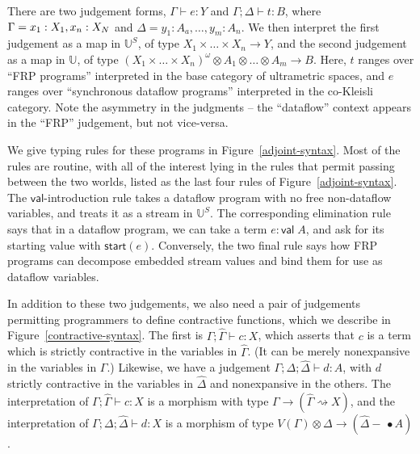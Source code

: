 \documentclass[nocopyrightspace,preprint]{sigplanconf}
\newcommand{\ultrametric}{\mathbb{U}}
\newcommand{\shrink}{\rightsquigarrow}
\newcommand{\Start}[1]{\mathsf{start}(#1)}
\newcommand{\lollishrink}{-\!\!\!\,\bullet}
\newcommand{\valtype}[1]{\mathsf{val}\;{#1}}
\newcommand{\judgeu}[3]{{#1} \vdash {#2} : {#3}}
\newcommand{\judgek}[4][\Gamma]{{#1};{#2} \vdash {#3} : {#4}}
\newcommand{\judgec}[4][\Gamma]{{#1};{#2} \vdash {#3} : {#4}}
\newcommand{\judgekc}[4][\Delta]{\Gamma;{#1};{#2} \vdash {#3} : {#4}}
\begin{document}
There are two judgement forms, $\judgeu{\Gamma}{e}{Y}$ and
$\judgek{\Delta}{t}{B}$, where $\Gamma = x_1:X_1,\label,x_n:X_N$ and
$\Delta = y_1:A_a, \ldots, y_m:A_n$.  We then interpret the first
judgement as a map in $\ultrametric^S$, of type $X_1 \times \ldots
\times X_n \to Y$, and the second judgement as a map in
$\ultrametric$, of type $(X_1 \times \ldots \times X_n)^\omega
\otimes A_1 \otimes \ldots \otimes A_m \to B$. Here, $t$ ranges over
``FRP programs'' interpreted in the base category of ultrametric
spaces, and $e$ ranges over ``synchronous dataflow programs''
interpreted in the co-Kleisli category. Note the asymmetry in 
the judgments -- the ``dataflow'' context appears in the ``FRP''
judgement, but not vice-versa. 

We give typing rules for these programs in
Figure~\ref{adjoint-syntax}.  Most of the rules are routine, with all
of the interest lying in the rules that permit passing between the two
worlds, listed as the last four rules of
Figure~\ref{adjoint-syntax}. The $\mathsf{val}$-introduction rule
takes a dataflow program with no free non-dataflow variables, and
treats it as a stream in $\ultrametric^S$. The corresponding elimination
rule says that in a dataflow program, we can take a term $e :
\valtype{A}$, and ask for its starting value with
$\Start{e}$. Conversely, the two final rule says how FRP programs
can decompose embedded stream values and bind them for use as 
dataflow variables.

In addition to these two judgements, we also need a pair of judgements
permitting programmers to define contractive functions, which we
describe in Figure~\ref{contractive-syntax}. The first is
$\judgec{\hat{\Gamma}}{c}{X}$, which asserts that $c$ is a term which
is strictly contractive in the variables in $\hat{\Gamma}$.  (It can
be merely nonexpansive in the variables in $\Gamma$.) Likewise, we
have a judgement $\judgekc{\hat{\Delta}}{d}{A}$, with $d$ 
strictly contractive in the variables in $\hat{\Delta}$ and
nonexpansive in the others. The interpretation of
$\judgec{\hat{\Gamma}}{c}{X}$ is a morphism with type $\Gamma \to
(\hat{\Gamma} \shrink X)$, and the interpretation of
$\judgekc{\hat{\Delta}}{d}{X}$ is a morphism of type $V(\Gamma)
\otimes \Delta \to (\hat{\Delta} \lollishrink A)$.  
\end{document}
